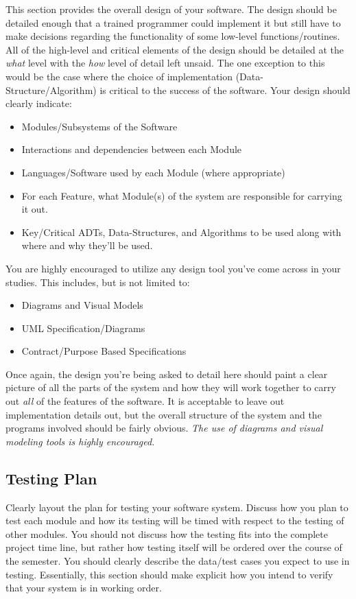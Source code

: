 \documentclass[10pt]{article}
\begin{document}
This section provides the overall design of your software.  The design should be detailed enough that a trained programmer could implement it but still have to make decisions regarding the functionality of some low-level functions/routines.  All of the high-level and critical elements of the design should be detailed at the \textit{what} level with the \textit{how} level of detail left unsaid.  The one exception to this would be the case where the choice of implementation (Data-Structure/Algorithm) is critical to the success of the software.  Your design should clearly indicate:
\begin{itemize}
\item Modules/Subsystems of the Software
\item Interactions and dependencies between each Module 
\item Languages/Software used by each Module (where appropriate)
\item For each Feature, what Module(s) of the system are responsible for carrying it out. 
\item Key/Critical ADTs, Data-Structures, and Algorithms to be used along with where and why they'll be used.
\end{itemize}
You are highly encouraged to utilize any design tool you've come across in your studies. This includes, but is not limited to:
\begin{itemize}
\item Diagrams and Visual Models
\item UML Specification/Diagrams 
\item Contract/Purpose Based Specifications 
\end{itemize}
Once again, the design you're being asked to detail here should paint a clear picture of all the parts of the system and how they will work together to carry out \textit{all} of the features of the software.  It is acceptable to leave out implementation details out, but the overall structure of the system and the programs involved should be fairly obvious.   \textit{The use of diagrams and visual modeling tools is highly encouraged.}  

\subsection{Testing Plan}

Clearly layout the plan for testing your software system.   Discuss how you plan to test each module and how its testing will be timed with respect to the testing of other modules.  You should not discuss how the testing fits into the complete project time line, but rather how testing itself will be ordered over the course of the semester.  You should clearly describe the data/test cases you expect to use in testing.  Essentially, this section should make explicit how you intend to verify that your system is in working order.
\end{document}
